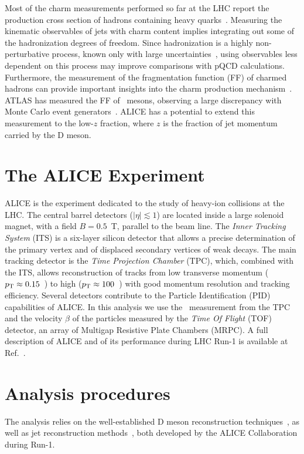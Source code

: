 \documentclass[a4paper]{jpconf}
\begin{document}
Most of the charm measurements performed so far at the LHC report the production cross section of hadrons
containing heavy quarks~\cite{ALICE:2012d, LHCb:2013a, ATLAS:2016a, ALICE:2016b}.
Measuring the kinematic observables of jets with charm content implies integrating out some of the hadronization degrees of freedom. 
Since hadronization is a highly non-perturbative process, known only with large uncertainties~\cite{dEnterria:2014}, 
using observables less dependent on this process may improve comparisons with pQCD calculations.
Furthermore, the measurement of the fragmentation function (FF) of charmed hadrons 
can provide important insights into the charm production mechanism~\cite{CDF:1990, UA1:1990, STAR:2009a}.
ATLAS has measured the FF of \Dstar\ mesons, observing a large discrepancy with Monte Carlo
event generators~\cite{ATLAS:2012d}. ALICE has a potential to extend this measurement to the low-$z$ fraction, where $z$ is the fraction
of jet momentum carried by the D meson.

\section{The ALICE Experiment}
ALICE is the experiment dedicated to the study of heavy-ion collisions at the LHC.
The central barrel detectors ($\lvert \eta\rvert \lesssim 1$) are located inside a large solenoid magnet, with a
field $B = 0.5$~T, parallel to the beam line.
The \emph{Inner Tracking System} (ITS) is a six-layer silicon detector that allows a precise determination of the primary vertex 
and of displaced secondary vertices of weak decays.
The main tracking detector is the \emph{Time Projection Chamber} (TPC), which, combined with the ITS, allows reconstruction of tracks 
from low transverse momentum ($p_{\rm T}\approx0.15$~\GeVc) to high
($p_{\rm T}\approx100$~\GeVc) with good momentum resolution and tracking efficiency.
Several detectors contribute to the Particle Identification (PID) capabilities of ALICE. 
In this analysis we use the \dedx\ measurement from the TPC and
the velocity $\beta$ of the particles measured by the \emph{Time Of Flight} (TOF) detector,
an array of Multigap Resistive Plate Chambers (MRPC).
A full description of ALICE and of its performance during LHC Run-1 is available at Ref.~\cite{ALICE:2014b}.

\section{Analysis procedures}
The analysis relies on the well-established D meson reconstruction techniques~\cite{ALICE:2012d, ALICE:2016a}, as well as
jet reconstruction methods~\cite{ALICE:2013c, ALICE:2015a, ALICE:2015e}, both developed by the ALICE Collaboration during Run-1.
\end{document}
